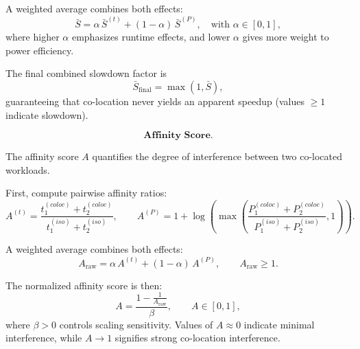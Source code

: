 A weighted average combines both effects:
\[
    \bar{S} =
    \alpha\, \bar{S}^{(t)} + (1 - \alpha)\, \bar{S}^{(P)},
    \quad \text{with } \alpha \in [0,1],
\]
where higher \(\alpha\) emphasizes runtime effects,
and lower \(\alpha\) gives more weight to power efficiency.

The final combined slowdown factor is
\[
    \bar{S}_{\text{final}} = \max(1, \bar{S}),
\]
guaranteeing that co-location never yields an apparent
speedup (values \(\ge 1\) indicate slowdown).

\[
    \textbf{Affinity Score.}
\]

The affinity score \(A\) quantifies the degree of
interference between two co-located workloads.

First, compute pairwise affinity ratios:
\[
    A^{(t)} =
    \frac{t_1^{(coloc)} + t_2^{(coloc)}}
    {t_1^{(iso)} + t_2^{(iso)}},
    \qquad
    A^{(P)} =
    1 + \log\!\left(
    \max\!\left(
    \frac{P_1^{(coloc)} + P_2^{(coloc)}}
    {P_1^{(iso)} + P_2^{(iso)}},
    1
    \right)
    \right).
\]

A weighted average combines both effects:
\[
    A_{\text{raw}} =
    \alpha\, A^{(t)} + (1 - \alpha)\, A^{(P)},
    \qquad A_{\text{raw}} \ge 1.
\]

The normalized affinity score is then:
\[
    A =
    \frac{1 - \frac{1}{A_{\text{raw}}}}{\beta},
    \qquad A \in [0, 1],
\]
where \(\beta > 0\) controls scaling sensitivity.
Values of $A \approx 0$ indicate minimal interference,
while \(A \to 1\) signifies strong co-location interference.

